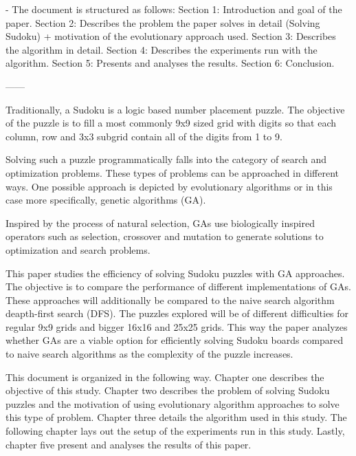 - The document is structured as follows:
Section 1: Introduction and goal of the paper.
Section 2: Describes the problem the paper solves in detail (Solving Sudoku) + motivation of the evolutionary approach used.
Section 3: Describes the algorithm in detail.
Section 4: Describes the experiments run with the algorithm.
Section 5: Presents and analyses the results.
Section 6: Conclusion.

------
 
Traditionally, a Sudoku is a logic based number placement puzzle. The objective of the puzzle is to fill a most commonly 9x9 sized grid with digits so that each column, row and 3x3 subgrid contain all of the digits from 1 to 9.\cite{}

Solving such a puzzle programmatically falls into the category of search and optimization problems. These types of problems can be approached in different ways. One possible approach is depicted by evolutionary algorithms or in this case more specifically, genetic algorithms (GA).\cite{}

Inspired by the process of natural selection, GAs use biologically inspired operators such as selection, crossover and mutation to generate solutions to optimization and search problems.

This paper studies the efficiency of solving Sudoku puzzles with GA approaches. The objective is to compare the performance of different implementations of GAs. These approaches will additionally be compared to the naive search algorithm deapth-first search (DFS). The puzzles explored will be of different difficulties for regular 9x9 grids and bigger 16x16 and 25x25 grids. This way the paper analyzes whether GAs are a viable option for efficiently solving Sudoku boards compared to naive search algorithms as the complexity of the puzzle increases.

This document is organized in the following way. Chapter one describes the objective of this study. Chapter two describes the problem of solving Sudoku puzzles and the motivation of using evolutionary algorithm approaches to solve this type of problem. Chapter three details the algorithm used in this study. The following chapter lays out the setup of the experiments run in this study. Lastly, chapter five present and analyses the results of this paper.
